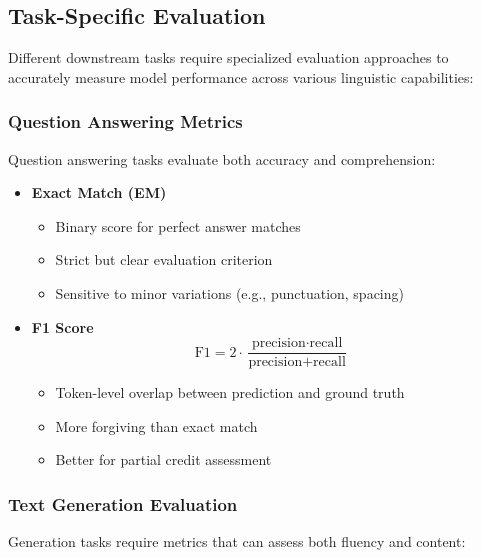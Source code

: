 \subsection{Task-Specific Evaluation}
\noindent
Different downstream tasks require specialized evaluation approaches to accurately measure model performance across various linguistic capabilities:

\subsubsection{Question Answering Metrics}
\noindent
Question answering tasks evaluate both accuracy and comprehension:

\begin{itemize}
    \item \textbf{Exact Match (EM)}
    \begin{itemize}
        \item Binary score for perfect answer matches
        \item Strict but clear evaluation criterion
        \item Sensitive to minor variations (e.g., punctuation, spacing)
    \end{itemize}
    
    \item \textbf{F1 Score}
    \begin{equation}
        \text{F1} = 2 \cdot \frac{\text{precision} \cdot \text{recall}}{\text{precision} + \text{recall}}
    \end{equation}
    \begin{itemize}
        \item Token-level overlap between prediction and ground truth
        \item More forgiving than exact match
        \item Better for partial credit assessment
    \end{itemize}
\end{itemize}

\subsubsection{Text Generation Evaluation}
\noindent
Generation tasks require metrics that can assess both fluency and content:

